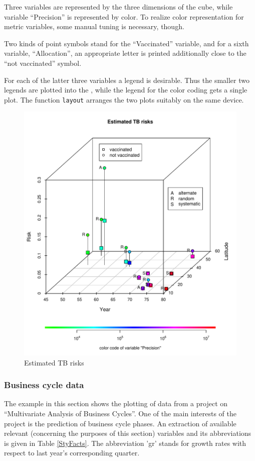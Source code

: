 Three variables are represented by the three dimensions of the cube, while
variable ``Precision'' is represented by color.  To realize color
representation for metric variables, some manual tuning is necessary,
though.

Two kinds of point symbols stand for the ``Vaccinated'' variable,
and for a sixth variable, ``Allocation'', an appropriate letter is printed
additionally close to the ``not vaccinated'' symbol.

For each of the latter three variables a legend is desirable.
Thus the smaller two legends are plotted into the \sdd ,
while the legend for the color coding gets a single plot.
The function {\tt layout} arranges the two plots suitably on the same device.

\begin{figure}[htb!]
\begin{center}\includegraphics[width=13cm]{meta}\end{center}
\caption{Estimated TB risks\label{fig:meta}}
\end{figure}
\clearpage


\subsubsection{Business cycle data}
The example in this section shows the plotting of data from a project on ``Multivariate Analysis of Business Cycles''.
One of the main interests of the project is the prediction of business cycle phases.
An extraction of available relevant (concerning the purposes of this section) variables
and its abbreviations is given in Table \ref{StyFacts}.
The abbreviation 'gr' stands for growth rates with respect to last year's
corresponding quarter.

